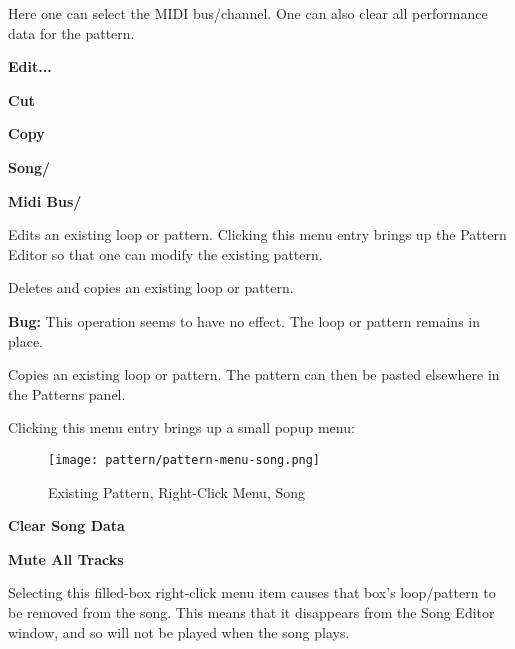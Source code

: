    Here one can select the MIDI bus/channel.
   One can also clear all performance data for the pattern.
   
   \begin{enumber}
      \item \textbf{Edit...}
      \item \textbf{Cut}
      \item \textbf{Copy}
      \item \textbf{Song/}
      \item \textbf{Midi Bus/}
   \end{enumber}

   \setcounter{ItemCounter}{0}      %

   Edits an existing loop or pattern.
   Clicking this menu entry brings up the Pattern Editor
   so that one can modify the existing pattern.

   Deletes and copies an existing loop or pattern.

   \textbf{Bug:}
   This operation seems to have no effect.  The loop or pattern remains in
   place.

   Copies an existing loop or pattern.
   The pattern can then be pasted elsewhere in the Patterns panel.

   Clicking this menu entry brings up a small popup menu:

\begin{figure}[H]
   \centering 
   \texttt{[image: pattern/pattern-menu-song.png]}
   \caption{Existing Pattern, Right-Click Menu, Song}
   \label{fig:pattern_window_right_click_song}
\end{figure}

   \begin{enumber}
      \item \textbf{Clear Song Data}
      \item \textbf{Mute All Tracks}
   \end{enumber}

   \setcounter{ItemCounter}{0}      %

   Selecting this filled-box right-click menu item causes that box's
   loop/pattern to be removed from the song.  This means
   that it disappears from the Song Editor window, and so will not
   be played when the song plays.

